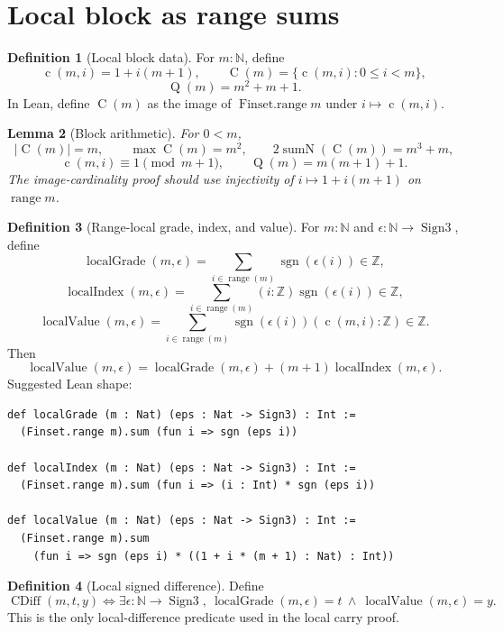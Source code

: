 \documentclass[11pt]{article}
\theoremstyle{definition}
\newtheorem{definition}{Definition}[section]
\theoremstyle{plain}
\newtheorem{lemma}[definition]{Lemma}
\theoremstyle{remark}
\newcommand{\N}{\mathbb{N}}
\newcommand{\Z}{\mathbb{Z}}
\newcommand{\Sgn}{\operatorname{Sign3}}
\newcommand{\sgn}{\operatorname{sgn}}
\newcommand{\card}[1]{\left|#1\right|}
\newcommand{\range}{\operatorname{range}}
\newcommand{\SumN}{\operatorname{sumN}}
\newcommand{\celt}{\operatorname{c}}
\newcommand{\Cblock}{\operatorname{C}}
\newcommand{\Qfun}{\operatorname{Q}}
\newcommand{\CDiff}{\operatorname{CDiff}}
\newcommand{\LGrade}{\operatorname{localGrade}}
\newcommand{\LIndex}{\operatorname{localIndex}}
\newcommand{\LVal}{\operatorname{localValue}}
\begin{document}
\section{Local block as range sums}

\begin{definition}[Local block data]\label{def:v9-local-block}
For \(m:\N\), define
\[
        \celt(m,i)=1+i(m+1),
        \qquad
        \Cblock(m)=\{\celt(m,i):0\le i<m\},
\]
\[
        \Qfun(m)=m^2+m+1.
\]
In Lean, define \(\Cblock(m)\) as the image of \(\operatorname{Finset.range} m\) under \(i\mapsto\celt(m,i)\).
\end{definition}

\begin{lemma}[Block arithmetic]\label{lem:v9-block-arithmetic}
For \(0<m\),
\[
        \card{\Cblock(m)}=m,
        \qquad
        \max \Cblock(m)=m^2,
        \qquad
        2\SumN(\Cblock(m))=m^3+m,
\]
\[
        \celt(m,i)\equiv1\pmod {m+1},
        \qquad
        \Qfun(m)=m(m+1)+1.
\]
The image-cardinality proof should use injectivity of \(i\mapsto1+i(m+1)\) on \(\operatorname{range}m\).
\end{lemma}

\begin{definition}[Range-local grade, index, and value]\label{def:v9-local-sums}
For \(m:\N\) and \(\epsilon:\N\to\Sgn\), define
\[
        \LGrade(m,\epsilon)=\sum_{i\in\range(m)}\sgn(\epsilon(i))\in\Z,
\]
\[
        \LIndex(m,\epsilon)=\sum_{i\in\range(m)}(i:\Z)\sgn(\epsilon(i))\in\Z,
\]
\[
        \LVal(m,\epsilon)=\sum_{i\in\range(m)}\sgn(\epsilon(i))(\celt(m,i):\Z)\in\Z.
\]
Then
\[
        \LVal(m,\epsilon)=\LGrade(m,\epsilon)+(m+1)\LIndex(m,\epsilon).
\]
Suggested Lean shape:
\begin{verbatim}
def localGrade (m : Nat) (eps : Nat -> Sign3) : Int :=
  (Finset.range m).sum (fun i => sgn (eps i))

def localIndex (m : Nat) (eps : Nat -> Sign3) : Int :=
  (Finset.range m).sum (fun i => (i : Int) * sgn (eps i))

def localValue (m : Nat) (eps : Nat -> Sign3) : Int :=
  (Finset.range m).sum
    (fun i => sgn (eps i) * ((1 + i * (m + 1) : Nat) : Int))
\end{verbatim}
\end{definition}

\begin{definition}[Local signed difference]\label{def:v9-cdiff}
Define
\[
        \CDiff(m,t,y)\Longleftrightarrow
        \exists \epsilon:\N\to\Sgn,
        \ \LGrade(m,\epsilon)=t\ \wedge\ \LVal(m,\epsilon)=y.
\]
This is the only local-difference predicate used in the local carry proof.
\end{definition}
\end{document}
